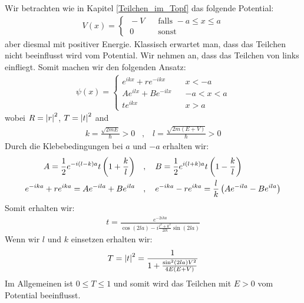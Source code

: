 Wir betrachten wie in Kapitel \ref{Teilchen_im_Topf} das folgende Potential:
\begin{align*}
    V(x) = \begin{cases}
        \ -V \hspace{10pt} &\text{falls } -a \leq x \leq a
        \\
        \ 0 \hspace{10pt} &\text{sonst}
    \end{cases}
\end{align*}
aber diesmal mit positiver Energie. Klassisch erwartet man, dass das Teilchen
nicht beeinflusst wird vom Potential. Wir nehmen an, dass das Teilchen von
links einfliegt. Somit machen wir den folgenden Ansatz:
\begin{align*}
    \psi(x) = \begin{cases}
        e^{i k x} + r e^{-i k x} \hspace{10pt} &x<-a
        \\
        A e^{i l x} + B e^{-i l x} \hspace{10pt} &-a<x<a
        \\
        t e^{i k x} \hspace{10pt} &x>a
    \end{cases}
\end{align*}
wobei $R = \left\vert r \right\vert^2$, $T = \left\vert t \right\vert^2$ and
\begin{align*}
    k = \frac{\sqrt{2 m E}}{\hbar} > 0
    \hspace{10pt} , \hspace{10pt}
    l = \frac{\sqrt{2 m (E+V)}}{\hbar} > 0
\end{align*}
Durch die Klebebedingungen bei $a$ und $-a$ erhalten wir:
\begin{align*}
    A = \frac{1}{2} e^{-i(l-k) a} t \left( 1 + \frac{k}{l} \right)
    \hspace{10pt} &, \hspace{10pt}
    B = \frac{1}{2} e^{i(l+k)a} t \left( 1 - \frac{k}{l} \right)
    \\
    e^{-i k a} + r e^{i k a} = A e^{-i l a} + B e^{i l a}
    \hspace{10pt} &, \hspace{10pt}
    e^{-i k a} - r e^{i k a} = \frac{l}{k} \left( A e^{-i l a} - B e^{i l a} \right)
\end{align*}
Somit erhalten wir:
\begin{align}\label{transmission}
    t = \frac{e^{-2 i k a}}{\cos(2 l a) - i \frac{l^2 + k^2}{2 l k} \sin(2 l a)}
\end{align}
Wenn wir $l$ und $k$ einsetzen erhalten wir:
\begin{align*}
    T = \left\vert t \right\vert^2 = \frac{1}{1 + \frac{\sin^2(2 l a) V^2}{4 E (E + V)}}
\end{align*}
Im Allgemeinen ist $0 \leq T \leq 1$ und somit wird das Teilchen mit $E>0$
vom Potential beeinflusst.

